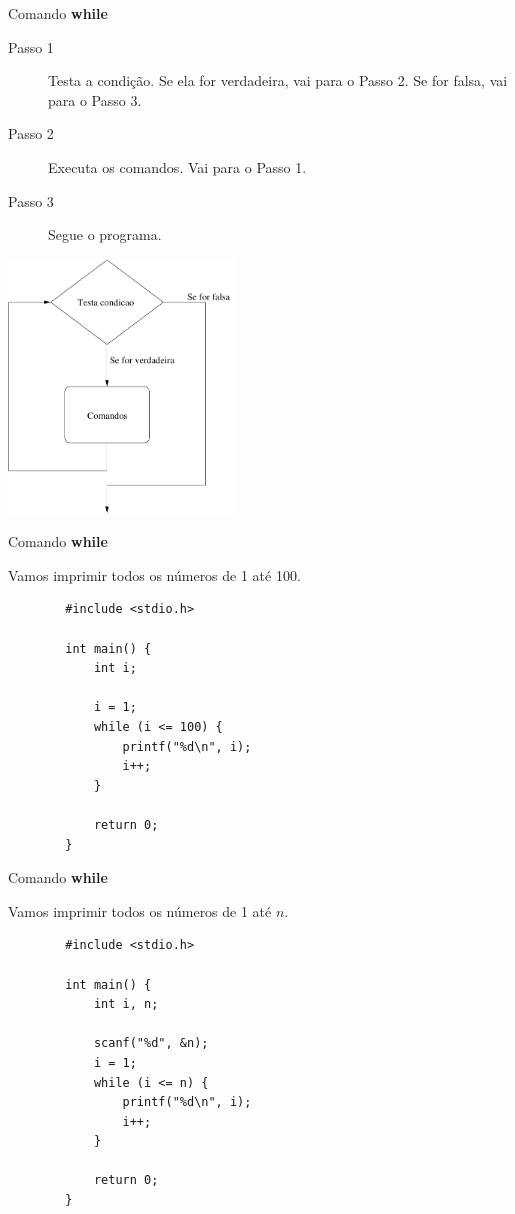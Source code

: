\documentclass[handout]{beamer}
\begin{document}
\begin{frame}[fragile]{Comando {\bf while}}

    \begin{description}
        \item[Passo 1] Testa a condição. Se ela for verdadeira, vai para o Passo 2. Se for falsa, vai para o Passo 3.
        \item[Passo 2] Executa os comandos. Vai para o Passo 1.
        \item[Passo 3] Segue o programa.
    \end{description}

    \begin{center}
        \includegraphics[width=0.45\textwidth]{figs/while}
    \end{center}
\end{frame}

\begin{frame}[fragile]{Comando {\bf while}}

    Vamos imprimir todos os números de 1 até 100.

    \begin{verbatim}
        #include <stdio.h>

        int main() {
            int i;

            i = 1;
            while (i <= 100) {
                printf("%d\n", i);
                i++;
            }

            return 0;
        }
    \end{verbatim}
\end{frame}

\begin{frame}[fragile]{Comando {\bf while}}

    Vamos imprimir todos os números de 1 até $n$.

    \begin{verbatim}
        #include <stdio.h>

        int main() {
            int i, n;

            scanf("%d", &n);
            i = 1;
            while (i <= n) {
                printf("%d\n", i);
                i++;
            }

            return 0;
        }
    \end{verbatim}
\end{frame}
\end{document}
